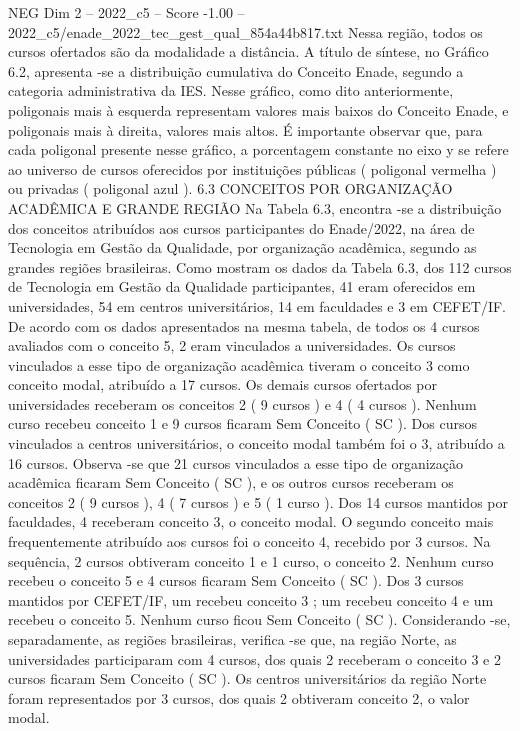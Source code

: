 \begin{textsample}{NEG Dim 2 – 2022\_c5 – Score -1.00 – 2022\_c5/enade\_2022\_tec\_gest\_qual\_854a44b817.txt}
Nessa região, todos os cursos ofertados são da modalidade a distância.
A título de síntese, no Gráfico 6.2, apresenta -se a distribuição cumulativa do Conceito Enade, segundo a categoria administrativa da IES.
Nesse gráfico, como dito anteriormente, poligonais mais à esquerda representam valores mais baixos do Conceito Enade, e poligonais mais à direita, valores mais altos.
É importante observar que, para cada poligonal presente nesse gráfico, a porcentagem constante no eixo y se refere ao universo de cursos oferecidos por instituições públicas ( poligonal vermelha ) ou privadas ( poligonal azul ). 6.3 CONCEITOS POR ORGANIZAÇÃO ACADÊMICA E GRANDE REGIÃO Na Tabela 6.3, encontra -se a distribuição dos conceitos atribuídos aos cursos participantes do Enade/2022, na área de Tecnologia em Gestão da Qualidade, por organização acadêmica, segundo as grandes regiões brasileiras.
Como mostram os dados da Tabela 6.3, dos 112 cursos de Tecnologia em Gestão da Qualidade participantes, 41 eram oferecidos em universidades, 54 em centros universitários, 14 em faculdades e 3 em CEFET/IF.
De acordo com os dados apresentados na mesma tabela, de todos os 4 cursos avaliados com o conceito 5, 2 eram vinculados a universidades.
Os cursos vinculados a esse tipo de organização acadêmica tiveram o conceito 3 como conceito modal, atribuído a 17 cursos.
Os demais cursos ofertados por universidades receberam os conceitos 2 ( 9 cursos ) e 4 ( 4 cursos ).
Nenhum curso recebeu conceito 1 e 9 cursos ficaram Sem Conceito ( SC ).
Dos cursos vinculados a centros universitários, o conceito modal também foi o 3, atribuído a 16 cursos.
Observa -se que 21 cursos vinculados a esse tipo de organização acadêmica ficaram Sem Conceito ( SC ), e os outros cursos receberam os conceitos 2 ( 9 cursos ), 4 ( 7 cursos ) e 5 ( 1 curso ).
Dos 14 cursos mantidos por faculdades, 4 receberam conceito 3, o conceito modal.
O segundo conceito mais frequentemente atribuído aos cursos foi o conceito 4, recebido por 3 cursos.
Na sequência, 2 cursos obtiveram conceito 1 e 1 curso, o conceito 2.
Nenhum curso recebeu o conceito 5 e 4 cursos ficaram Sem Conceito ( SC ).
Dos 3 cursos mantidos por CEFET/IF, um recebeu conceito 3 ; um recebeu conceito 4 e um recebeu o conceito 5.
Nenhum curso ficou Sem Conceito ( SC ).
Considerando -se, separadamente, as regiões brasileiras, verifica -se que, na região Norte, as universidades participaram com 4 cursos, dos quais 2 receberam o conceito 3 e 2 cursos ficaram Sem Conceito ( SC ).
Os centros universitários da região Norte foram representados por 3 cursos, dos quais 2 obtiveram conceito 2, o valor modal.

\end{textsample}
